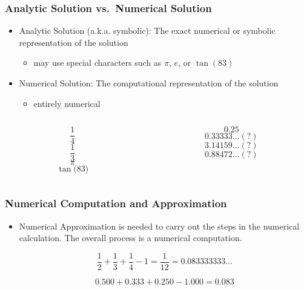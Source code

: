 \documentclass[10pt]{beamer}
\begin{document}
\begin{frame}
\frametitle{Analytic Solution vs.~Numerical Solution}
\begin{itemize}
\item Analytic Solution (a.k.a. symbolic): The exact numerical or symbolic representation of
the solution
  \begin{itemize}
  \item may use special characters such as $\pi$, $e$, or $\tan{(83)}$
  \end{itemize}
\item Numerical Solution: The computational representation of the solution
  \begin{itemize}
  \item entirely numerical
  \end{itemize}
\end{itemize}
\begin{columns}
\begin{column}{0.45\textwidth}
\begin{example}[analytic]
\[
\frac{1}{4}
\]
\[
\frac{1}{3}
\]
\[
\pi
\]
\[
\tan{(83})
\]
\end{example}
\end{column}
\begin{column}{0.45\textwidth}
\begin{example}[numerical]
\[
0.25
\]
\[
0.33333\dots(?)
\]
\[
3.14159\dots(?)
\]
\[
0.88472\dots(?)
\]
\end{example}
\end{column}
\end{columns}
\end{frame}
\begin{frame}
\frametitle{Numerical Computation and Approximation}
\begin{itemize}
\item Numerical Approximation is needed to carry out the steps in the
numerical calculation.  The overall process is a numerical computation.
\begin{example}
\[
\frac{1}{2} +
\frac{1}{3} +
\frac{1}{4} - 1 = \frac{1}{12} = 0.083333333\dots
\]
\end{example}
\begin{example}
\[
0.500 +
0.333 +
0.250
- 1.000 = 0.083
\]
\end{example}
\end{itemize}
\end{frame}
\end{document}
